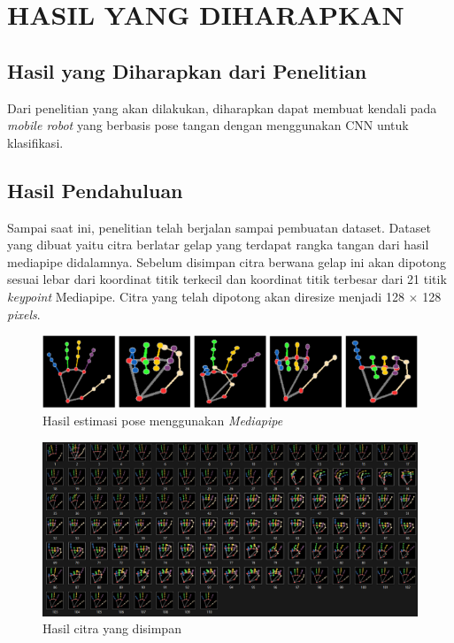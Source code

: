 \chapter{HASIL YANG DIHARAPKAN}

\section{Hasil yang Diharapkan dari Penelitian}

Dari penelitian yang akan dilakukan, diharapkan dapat membuat kendali pada \textit{mobile robot} yang berbasis pose tangan dengan menggunakan CNN untuk klasifikasi.

\section{Hasil Pendahuluan}
Sampai saat ini, penelitian telah berjalan sampai pembuatan dataset. Dataset yang dibuat yaitu citra berlatar gelap yang terdapat rangka tangan dari hasil mediapipe didalamnya. Sebelum disimpan citra berwana gelap ini akan dipotong sesuai lebar dari koordinat titik terkecil dan koordinat titik terbesar dari 21 titik \textit{keypoint} Mediapipe. Citra yang telah dipotong akan diresize menjadi 128 $\times$ 128 \textit{pixels}.

\begin{figure}[!h]
	\centering
	\includegraphics[width=1\linewidth]{gambar/hasilpose.png}
	\caption{Hasil estimasi pose menggunakan \textit{Mediapipe}}
	\label{fig:gambar41}
\end{figure}

\begin{figure}[!h]
	\centering
	\includegraphics[width=1\linewidth]{gambar/folderdataset.png}
	\caption{Hasil citra yang disimpan}
	\label{fig:gambardatasetfolder}
\end{figure}

